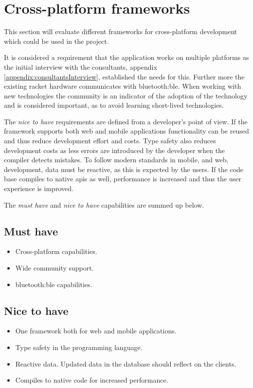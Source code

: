 \section{Cross-platform frameworks}

This section will evaluate different frameworks for cross-platform development which could be used in the project.

It is considered a requirement that the application works on multiple platforms as the initial interview with the consultants, appendix \ref{appendix:consultantsInterview}, established the needs for this. Further more the existing racket hardware communicates with \gls{bluetooth:ble}.
When working with new technologies the community is an indicator of the adoption of the technology and is considered important, as to avoid learning short-lived technologies.

The \textit{nice to have} requirements are defined from a developer's point of view.
If the framework supports both web and mobile applications functionality can be reused and thus reduce development effort and costs.
Type safety also reduces development costs as less errors are introduced by the developer when the compiler detects mistakes.
To follow modern standards in mobile, and web, development, data must be reactive, as this is expected by the users.
If the code base compiles to native \glspl{api} as well, performance is increased and thus the user experience is improved.

The \textit{must have} and \textit{nice to have} capabilities are summed up below.

\subsection*{Must have}
\begin{itemize}
	\item Cross-platform capabilities.
	\item Wide community support.
	\item \gls{bluetooth:ble} capabilities.
\end{itemize}

\subsection*{Nice to have}
\begin{itemize}
	\item One framework both for web and mobile applications.
	\item Type safety in the programming language.
	\item Reactive data. Updated data in the database should reflect on the clients.
	\item Compiles to native code for increased performance.
\end{itemize}

